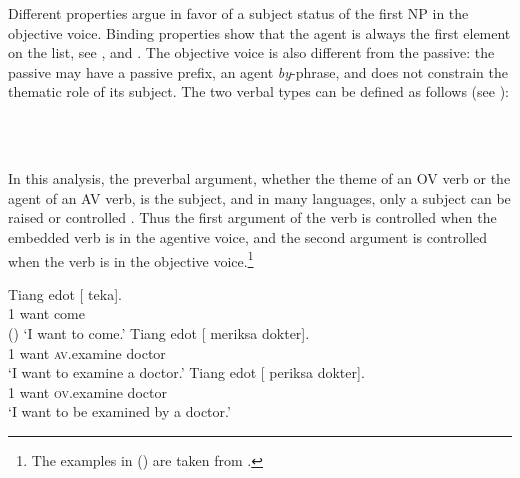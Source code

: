 \documentclass[output=paper
	        ,collection
	        ,collectionchapter
 	        ,biblatex
                ,babelshorthands
                ,newtxmath
                ,draftmode
                ,colorlinks, citecolor=brown
]{langscibook}
\begin{document}
Different properties argue in favor of a subject status of the first NP in the objective
voice. Binding properties show that the agent is always the first element on the \argst list, see
,  and . The objective
voice is also different from the passive: the passive may have a passive prefix, an agent
\emph{by}-phrase, and does not constrain the thematic role of its subject. The two verbal types can
be defined as follows (see ):

\eal
\ex 
{} \impl\\
\ex 
{} \impl\\
\zl

In this analysis, the preverbal argument, whether the theme of an OV verb or the agent of an AV
verb, is the subject, and in many languages, only a subject can be raised or controlled
\citep{Zaenenetal1985}. Thus the first argument of the verb is controlled when the embedded verb is
in the agentive voice, and the second argument is controlled when the verb is in the objective
voice.\footnote{%
  The examples in () are taken from .
}


\begin{exe}
\ex \begin{xlist}
\ex 
\gll Tiang edot [ \trace{} teka].\\
     1 want     {} {} come\\\hfill()
\glt `I want to come.'
\ex 
\gll Tiang edot [ \trace{}  meriksa dokter].\\
     1     want {} {}     \textsc{av}.examine doctor\\
\glt `I want to examine a doctor.'
\ex 
\gll Tiang edot [ \trace{} periksa dokter].\\
     1     want {} {}    \textsc{ov}.examine doctor\\
\glt `I want to be examined by a doctor.'
\end{xlist}
\end{exe}
\end{document}
